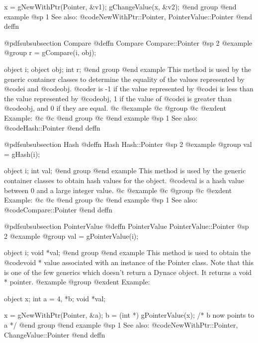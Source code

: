 x = gNewWithPtr(Pointer, &v1);
gChangeValue(x, &v2);
@end group
@end example
@sp 1
See also:  @code{NewWithPtr::Pointer, PointerValue::Pointer}
@end deffn







@pdfsubsubsection {Compare}
@deffn {Compare} Compare::Pointer
@sp 2
@example
@group
r = gCompare(i, obj);

object  i;
object  obj;
int     r;
@end group
@end example
This method is used by the generic container classes to determine
the equality of the values represented by @code{i} and @code{obj}. 
@code{r} is -1 if the value represented by @code{i} is less than
the value represented by @code{obj}, 1 if the value of @code{i}
is greater than @code{obj}, and 0 if they are equal.
@c @example
@c @group
@c @exdent Example:
@c
@c @end group
@c @end example
@sp 1
See also:  @code{Hash::Pointer}
@end deffn







@pdfsubsubsection {Hash}
@deffn {Hash} Hash::Pointer
@sp 2
@example
@group
val = gHash(i);

object  i;
int     val;
@end group
@end example
This method is used by the generic container classes to obtain hash values
for the object.  @code{val}
is a hash value between 0 and a large integer value.
@c @example
@c @group
@c @exdent Example:
@c
@c @end group
@c @end example
@sp 1
See also:  @code{Compare::Pointer}
@end deffn







@pdfsubsubsection {PointerValue}
@deffn {PointerValue} PointerValue::Pointer
@sp 2
@example
@group
val = gPointerValue(i);

object  i;
void    *val;
@end group
@end example
This method is used to obtain the @code{void *} value associated with an
instance of the Pointer class.  Note that this is one of the few
generics which doesn't return a Dynace object.  It returns a void * pointer.
@example
@group
@exdent Example:

object  x;
int     a = 4, *b;
void    *val;

x = gNewWithPtr(Pointer, &a);
b = (int *) gPointerValue(x);
/*  b now points to a  */
@end group
@end example
@sp 1
See also:  @code{NewWithPtr::Pointer, ChangeValue::Pointer}
@end deffn








